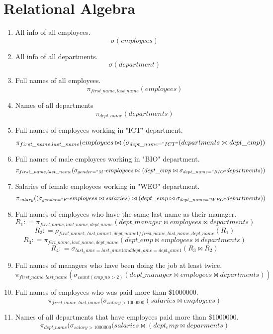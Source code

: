 \documentclass{article}
\begin{document}
\section*{Relational Algebra}
\begin{enumerate}
	\item All info of all employees.
	$$\sigma(employees)$$
	\item All info of all departments.
	$$\sigma(department)$$
	\item Full names of all employees.
	 $$\pi_{first\_name, last\_name} (employees)$$
	\item Names of all departments
	$$\pi_{dept\_name} (departments)$$
	\item Full names of employees working in "ICT" department.
	$$ \pi_{first\_name, last\_name}(employees \bowtie (\sigma_{dept\_name = "ICT"} (departments \bowtie dept\_emp ))$$
	\item Full names of male employees working in "BIO" department.
	 $$ \pi_{first\_name, last\_name}(\sigma_{gender = "M"} employees \bowtie (dept\_emp \bowtie \sigma_{dept\_name = "BIO"} departments))$$
	\item Salaries of female employees working in "WEO" department.
	$$ \pi_{salary}((\sigma_{gender = "F"} employees  \bowtie salaries) \bowtie (dept\_emp \bowtie \sigma_{dept\_name = "WEO"} departments))$$
	\item Full names of employees who have the same last name as their manager.
	$$ R_{1}: = \pi_{first\_name, last\_name, dept\_name}(dept\_manager \bowtie employees \bowtie departments)$$
	$$ R_{2}: = \rho_{first\_name1, last\_name1, dept\_name1/first\_name, last\_name, dept\_name }(R_{1})$$
	$$ R_{3}: = \pi_{firt\_name, last\_name, dept\_name} (dept\_emp \bowtie employees \bowtie departments) $$
	$$ R_{4}: = \sigma_{last_name = last_name1 and dept_name = dept_name1}(R_{3} \bowtie R_{2})$$
	\item Full names of managers who have been doing the job at least twice.
	$$ \pi_{first\_name, last\_name}( \sigma_{count(emp\_no > 2)}(dept\_manager \bowtie employees \bowtie departments))$$
	\item Full names of employees who was paid more than \$1000000.
	$$ \pi_{first\_name, last\_name}(\sigma_{salary > 1000000}(salaries \bowtie employees)$$
	\item Names of all departments that have employees paid more than \$1000000.
	$$ \pi_{dept\_name}(\sigma_{salary > 1000000}(salaries \bowtie (dept_emp \bowtie deparments)$$
\end{enumerate}
\end{document}
